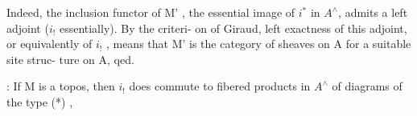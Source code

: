 Indeed,  the inclusion functor  of M' ,  the essential image of $i^{*}$
in $A^{\wedge}$,   admits a left adjoint ($i_{!}$  essentially).  By the criteri-%
on of Giraud,  left exactness of this adjoint,  or equivalently of $i_{!}$ ,
means that M' is the category of sheaves on A for a suitable site struc-%
ture on A,  qed.

\hand{\uline{\textcolor{black}{Corollary}}}:  If M is \hand{\uline{\textcolor{black}{not}}} a topos,  then $i_{!}$  does \hand{\uline{\textcolor{black}{not}}}  commute to fibered
products  in $A^{\wedge}$ of diagrams of the type
(*)  ,

